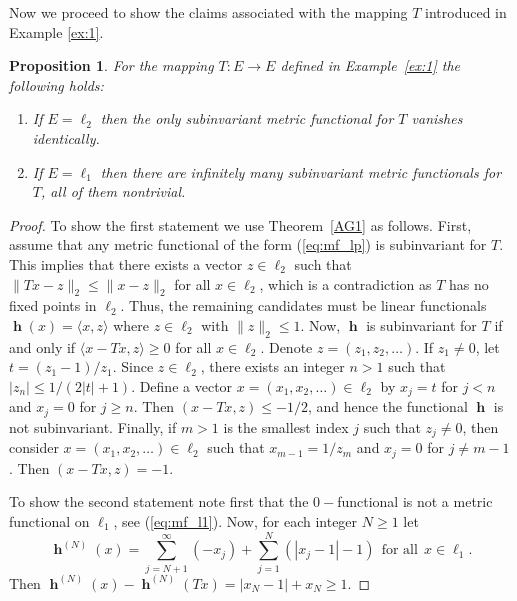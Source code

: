 \documentclass[a4paper,12pt]{article}
\newtheorem{proposition}[theorem]{Proposition}
\theoremstyle{definition}
\numberwithin{equation}{section}
\newcommand{\abs}[1]{\lvert#1\rvert} %
\newcommand{\norm}[1]{\lVert#1\rVert} %
\newcommand{\dpair}[2]{\langle#1, #2\rangle} %
\numberwithin{equation}{section}
\DeclareMathOperator{\h}{\mathbf{h}} %
\begin{document}
Now we proceed to show the claims associated 
with the mapping $T$ introduced in 
Example \ref{ex:1}. 

\begin{proposition}\label{prop:l1-l2claims}
For the mapping $T:E\to E$ defined in \textup{Example~\ref{ex:1}} the following 
holds:
\begin{enumerate}
\item If $E=\ell_2$ then the only 
subinvariant metric functional for $T$ 
vanishes identically.
\item If $E=\ell_1$ then there are infinitely 
many subinvariant metric functionals for $T$, 
all of them nontrivial. 
\end{enumerate}
\end{proposition}

\begin{proof}
    To show the first statement we use Theorem~\ref{AG1} as 
    follows. First, assume that any metric functional of the 
    form (\ref{eq:mf_lp}) is subinvariant for $T$. This 
    implies that there exists a vector $z\in \ell_2$ such 
    that $\norm{Tx-z}_2 \leq \norm{x-z}_2$ for all 
    $x\in \ell_2$, which is a contradiction as $T$ has no 
    fixed points in $\ell_2$. Thus, the remaining candidates 
    must be linear functionals $\h(x) = \dpair{x}{z}$ where
    $z\in\ell_2$ with $\norm{z}_2\leq 1$. Now, $\h$ is 
    subinvariant for $T$ if and only if $\dpair{x-Tx}{z} \geq 0$ 
    for all $x \in \ell_2$.  Denote $z= (z_1,z_2, \dots)$.  
    If $z_1\neq 0$, let $t=(z_1-1)/z_1$. Since $z\in\ell_2$,
    there exists an integer $n>1$ such that 
    $\abs{z_n} \leq 1/(2\abs{t}+1)$. Define a vector 
    $x=(x_1,x_2, \dots)\in \ell_2$ by $x_j=t$ for $j<n$ 
    and $x_j=0$ for $j\geq n$. Then $(x-Tx,z) \leq -1/2$, 
    and hence the functional $\h$ is not subinvariant. 
    Finally, if $m>1$ is the smallest index $j$ such that 
    $z_j \neq 0$, then consider $x=(x_1,x_2, \dots)\in \ell_2$ 
    such that $x_{m-1} = 1/z_m$ and $x_j=0$ for $j\neq m-1$. 
    Then $(x-Tx,z) = -1$.

    To show the second statement note first that the 
    $0-$functional is not a metric functional on $\ell_1$, 
    see (\ref{eq:mf_l1}). Now, for each integer $N\geq 1$ 
    let  
    $$
        \h^{(N)}(x) = \sum_{j=N+1}^\infty (-x_j) 
            + \sum_{j=1}^N (|x_j-1| - 1)\ \ 
            \text{for all}\ \ x\in\ell_1.
    $$
    Then $\h^{(N)}(x) - \h^{(N)}(Tx) = \abs{x_N -1} 
        + x_N \geq 1$.  
\end{proof}
\end{document}
